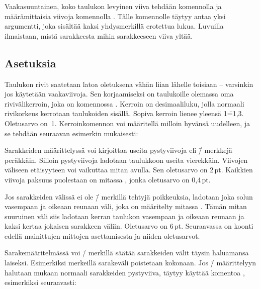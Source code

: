 Vaakasuuntainen, koko taulukon levyinen viiva tehdään komennolla
 ja määrämittaisia viivoja komennolla .
Tälle komennolle täytyy antaa yksi argumentti, joka sisältää kaksi
yhdysmerkillä erotettua lukua. Luvuilla ilmaistaan, mistä sarakkeesta
mihin sarakkeeseen viiva yltää.

\subsection{Asetuksia}

Taulukon rivit saatetaan latoa oletuksena vähän liian lähelle toisiaan
-- varsinkin jos käytetään vaakaviivoja. Sen korjaamiseksi on
taulukoille olemassa oma rivivälikerroin, joka on komennossa
. Kerroin on desimaaliluku, jolla normaali
rivikorkeus kerrotaan taulukoiden sisällä. Sopiva kerroin lienee yleensä
1\==1,3. Oletusarvo on~1. Kerroinkomennon voi määritellä milloin hyvänsä
uudelleen, ja se tehdään seuraavan esimerkin mukaisesti:

\begin{koodilohkosis}
\renewcommand{\arraystretch}{1.3}
\end{koodilohkosis}

\noindent
Sarakkeiden määrittelyssä voi kirjoittaa useita pystyviivoja eli
\koodi{|}\=/ merkkejä peräkkäin. Silloin pystyviivoja ladotaan
taulukkoon useita vierekkäin. Viivojen väliseen etäisyyteen voi
vaikuttaa mitan  avulla. Sen oletusarvo on 2\,pt.
Kaikkien viivoja paksuus puolestaan on mitassa ,
jonka oletusarvo on 0,4\,pt.

Jos sarakkeiden välissä ei ole \=/ merkillä tehtyjä
poikkeuksia, ladotaan joka solun vasempaan ja oikeaan reunaan väli, joka
on määritelty mitassa . Tämän mitan suuruinen väli
siis ladotaan kerran taulukon vasempaan ja oikeaan reunaan ja kaksi
kertaa jokaisen sarakkeen väliin. Oletusarvo on 6\,pt. Seuraavassa on
koonti edellä mainittujen mittojen asettamisesta ja niiden oletusarvot.

\begin{koodilohkosis}
\setlength{\doublerulesep}{2pt}
\setlength{\arrayrulewidth}{.4pt}
\setlength{\tabcolsep}{6pt}
\end{koodilohkosis}

\noindent
Sarakemääritelmässä voi \=/ merkillä säätää sarakkeiden välit
täysin haluamansa laiseksi. Esimerkiksi merkeillä 
sarakeväli poistetaan kokonaan. Jos \=/ määrittelyyn
halutaan mukaan normaali sarakkeiden pystyviiva, täytyy käyttää komentoa
, esimerkiksi seuraavasti:

